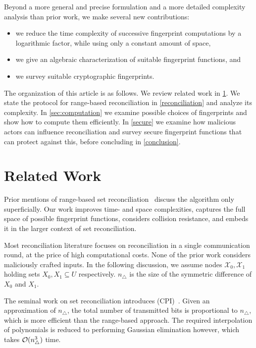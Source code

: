 \documentclass[conference]{IEEEtran}
\begin{document}
Beyond a more general and precise formulation and a more detailed complexity analysis than prior work, we make several new contributions:

\begin{itemize}
    \item we reduce the time complexity of successive fingerprint computations by a logarithmic factor, while using only a constant amount of space,
    \item we give an algebraic characterization of suitable fingerprint functions, and
    \item we survey suitable cryptographic fingerprints.
\end{itemize}

The organization of this article is as follows. We review related work in \cref{related-work}. We state the protocol for range-based reconciliation in \cref{reconciliation} and analyze its complexity. In \cref{sec:computation} we examine possible choices of fingerprints and show how to compute them efficiently. In \cref{secure} we examine how malicious actors can influence reconciliation and survey secure fingerprint functions that can protect against this, before concluding in \cref{conclusion}.

\section{Related Work}\label{related-work}

Prior mentions of range-based set reconciliation~\cite{chen1999prototype}\cite{shang2017survey} discuss the algorithm only superficially. Our work improves time- and space complexities, captures the full space of possible fingerprint functions, considers collision resistance, and embeds it in the larger context of set reconciliation.

Most reconciliation literature focuses on reconciliation in a single communication round, at the price of high computational costs. None of the prior work considers maliciously crafted inputs. In the following discussion, we assume nodes $\mathcal{X}_0, \mathcal{X}_1$ holding sets $X_0, X_1 \subseteq U$ respectively. $n_{\triangle}$ is the size of the symmetric difference of $X_0$ and $X_1$.

The seminal work on set reconciliation introduces  (CPI)~\cite{minsky2003set}. Given an approximation of $n_{\triangle}$, the total number of transmitted bits is proportional to $n_{\triangle}$, which is more efficient than the range-based approach. The required interpolation of polynomials is reduced to performing Gaussian elimination however, which takes $\mathcal{O}(n_{\triangle}^3)$ time.
\end{document}
